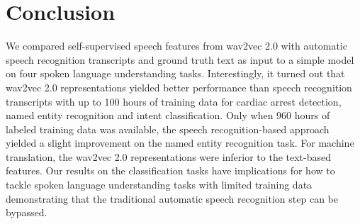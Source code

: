 \documentclass{article}
\begin{document}
\section{Conclusion}
\label{sec:conclusion}

We compared self-supervised speech features from wav2vec 2.0 with automatic speech recognition transcripts and ground truth text as input to a simple model on four spoken language understanding tasks. Interestingly, it turned out that wav2vec 2.0 representations yielded better performance than speech recognition transcripts with up to 100 hours of training data for cardiac arrest detection, named entity recognition and intent classification. Only when 960 hours of labeled training data was available, the speech recognition-based approach yielded a slight improvement on the named entity recognition task. For machine translation, the wav2vec 2.0 representations were inferior to the text-based features. Our results on the classification tasks have implications for how to tackle spoken language understanding tasks with limited training data demonstrating that the traditional automatic speech recognition step can be bypassed.




\vfill
\pagebreak




\end{document}
